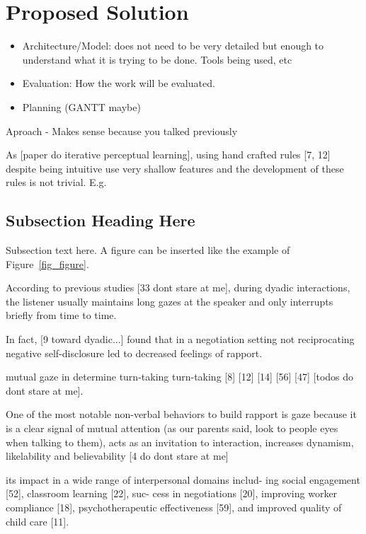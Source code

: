 \section{Proposed Solution}
\label{sec:Solution}

\begin{itemize}
	\item Architecture/Model: does not need to be very detailed but enough to understand what it is trying to be done. Tools being used, etc
	\item Evaluation: How the work will be evaluated.	
	\item Planning (GANTT maybe)	
\end{itemize}Aproach - Makes sense because you talked previously


As [paper do iterative perceptual learning], using hand crafted rules [7, 12] despite being intuitive use very shallow features and the development of these rules is not trivial.
E.g.

\subsection{Subsection Heading Here}
Subsection text here.
A figure can be inserted like the example of Figure~\ref{fig_figure}.

According to previous studies [33 dont stare at me], during dyadic interactions, the listener usually maintains long gazes at the speaker and only interrupts briefly from time to time. 

In fact, [9 toward dyadic...] found that in a negotiation setting not reciprocating negative self-disclosure led to decreased feelings of rapport. 
\cite{Bronstein2012} 

mutual gaze in determine turn-taking turn-taking [8] [12] [14] [56] [47] [todos do dont stare at me]. 

One of the most notable non-verbal behaviors to build rapport is gaze because it is a clear signal of mutual attention (as our parents said, look to people eyes when talking to them), acts as an invitation to interaction, increases dynamism, likelability and believability [4 do dont stare at me]



its impact in a wide range of interpersonal domains includ- ing social engagement [52], classroom learning [22], suc- cess in negotiations [20], improving worker compliance [18], psychotherapeutic effectiveness [59], and improved quality of child care [11].

